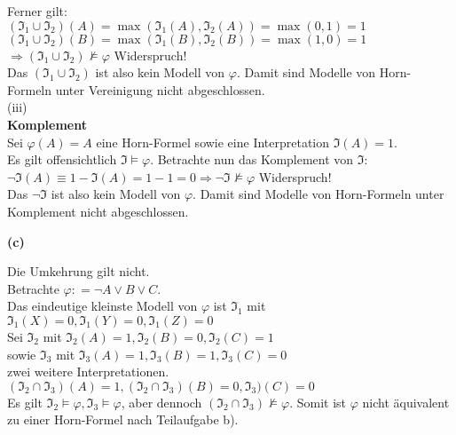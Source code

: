 \documentclass[11pt, a4paper]{article}
\newcommand{\defgr}{\mathrel{\mathop:\!\!=}}
\begin{document}
\begin{adjustwidth}{20pt}{20pt}
Ferner gilt:\\ 
$(\mathfrak{I_1} \cup \mathfrak{I_2})(A)= \max(\mathfrak{I_1}(A),\mathfrak{I_2}(A)) = \max(0,1) = 1$\\
$(\mathfrak{I_1} \cup \mathfrak{I_2})(B)= \max(\mathfrak{I_1}(B),\mathfrak{I_2}(B)) = \max(1,0) = 1$\\
$\Rightarrow (\mathfrak{I_1} \cup \mathfrak{I_2}) \not\models \varphi$ \qquad Widerspruch!\\

Das $(\mathfrak{I_1} \cup \mathfrak{I_2})$ ist also kein Modell von $\varphi$. Damit sind Modelle von Horn-Formeln unter Vereinigung nicht abgeschlossen.\\ 
(iii)\\
\textbf{Komplement}\\
Sei $\varphi(A)=A$ eine Horn-Formel sowie eine Interpretation $\mathfrak{I}(A)=1$.\\
 Es gilt offensichtlich $\mathfrak{I} \models \varphi$. Betrachte nun das Komplement von $\mathfrak{I}$:\\
 $\neg \mathfrak{I} (A) \equiv 1 - \mathfrak{I}(A) = 1- 1=0 \Rightarrow \neg \mathfrak{I} \not\models \varphi$ \qquad Widerspruch!\\
 
 Das $\neg \mathfrak{I}$ ist also kein Modell von $\varphi$. Damit sind Modelle von Horn-Formeln unter Komplement nicht abgeschlossen. 
\end{adjustwidth}
\textbf{(c)}
\begin{adjustwidth}{20pt}{20pt}
Die Umkehrung gilt nicht.\\

Betrachte $\varphi \defgr \neg A \vee B \vee C$.\\
 Das eindeutige kleinste Modell von $\varphi$ ist $\mathfrak{I_1}$ mit $\mathfrak{I_1}(X)=0,\mathfrak{I_1}(Y)=0,\mathfrak{I_1}(Z)=0$\\
 
 Sei $\mathfrak{I_2}$ mit $\mathfrak{I_2}(A)=1,\mathfrak{I_2}(B)=0,\mathfrak{I_2}(C)=1$\\
 sowie $\mathfrak{I_3}$ mit $\mathfrak{I_3}(A)=1,\mathfrak{I_3}(B)=1,\mathfrak{I_3}(C)=0$\\ zwei weitere Interpretationen.\\
 
 $(\mathfrak{I_2} \cap \mathfrak{I_3})(A)=1,(\mathfrak{I_2} \cap \mathfrak{I_3})(B)=0,\mathfrak{I_3})(C)=0$\\
 
  Es gilt $\mathfrak{I_2}  \models \varphi,\mathfrak{I_3} \models \varphi$, aber dennoch $(\mathfrak{I_2} \cap \mathfrak{I_3}) \not \models \varphi$. Somit ist $\varphi$ nicht äquivalent zu einer Horn-Formel nach Teilaufgabe b). 

\end{adjustwidth}
\end{document}
